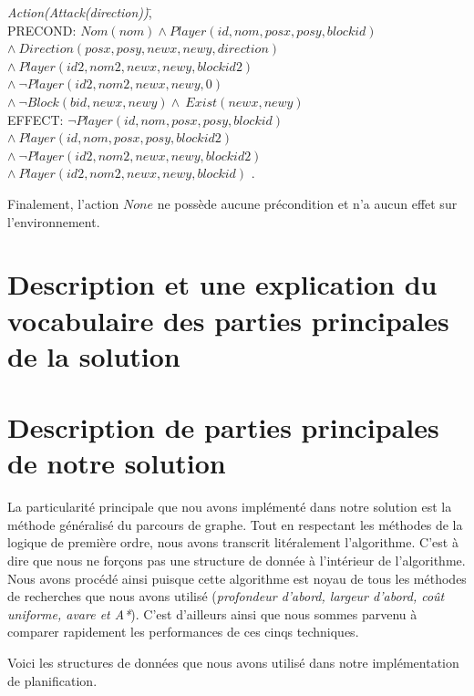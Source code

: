 \documentclass[12pt,english,frenchb,letterpaper]{article}
\begin{document}
\begin{tabbing}
\textit{Action}\=\textit{(Attack(direction))}\=,\\
\> PRECOND: \> $Nom(nom) \wedge Player(id,nom,posx,posy,blockid)$ \\ 
\> \> $  \wedge \ Direction(posx,posy,newx,newy,direction) $ \\
\> \> $  \wedge \ Player(id2,nom2,newx,newy,blockid2) $ \\
\> \> $  \wedge \ \lnot Player(id2,nom2,newx,newy,0) $ \\
\> \> $ \wedge\ \lnot Block(bid,newx,newy) \wedge \ Exist(newx,newy)$ \\               
\> EFFECT: \>$ \lnot Player(id,nom,posx,posy,blockid) $ \\
\>  \> $\wedge\ Player(id,nom,posx,posy,blockid2)$ \\
\>  \> $\wedge\ \lnot Player(id2,nom2,newx,newy,blockid2)$ \\
\>  \> $\wedge\ Player(id2,nom2,newx,newy,blockid)$ .\\
\end{tabbing}

Finalement, l'action $None$ ne possède aucune précondition et n'a aucun effet sur l'environnement.

\section{Description et une explication du vocabulaire des parties principales de la solution}

\section{Description de parties principales de notre solution}
La particularité principale que nou avons implémenté dans notre solution est la méthode généralisé du parcours de graphe. Tout en respectant les méthodes de la logique de première ordre, nous avons transcrit litéralement l'algorithme. C'est à dire que nous ne forçons pas une structure de donnée à l'intérieur de l'algorithme. Nous avons procédé ainsi puisque cette algorithme est noyau de tous les méthodes de recherches que nous avons utilisé (\textit{profondeur d'abord, largeur d'abord, coût uniforme, avare et A*}). C'est d'ailleurs ainsi que nous sommes parvenu à comparer rapidement les performances de ces cinqs techniques.

Voici les structures de données que nous avons utilisé dans notre implémentation de planification.
\end{document}
